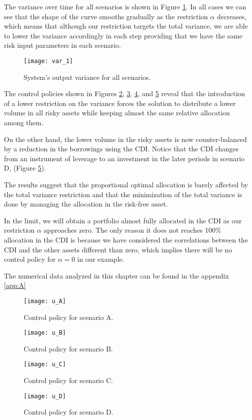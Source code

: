 The variance over time for all scenarios is shown in Figure \ref{fig:var1}. In all cases we can see that the shape of the curve smooths gradually as the restriction $\alpha$ decreases, which means that although our restriction targets the total variance, we are able to lower the variance accordingly in each step providing that we have the same risk input parameters in each scenario.
%
\begin{figure} [h!]
    \caption{System's output variance for all scenarios.}
    \centering
    \texttt{[image: var\_1]}
    \label{fig:var1}
\end{figure}

The control policies shown in Figures \ref{fig:u1}, \ref{fig:u2}, \ref{fig:u3}, and \ref{fig:u4} reveal that the introduction of a lower restriction on the variance forces the solution to distribute a lower volume in all risky assets while keeping almost the same relative allocation among them.

On the other hand, the lower volume in the risky assets is now counter-balanced by a reduction in the borrowings using the CDI. Notice that the CDI changes from an instrument of leverage to an investment in the later periods in scenario D, (Figure \ref{fig:u4}).

The results suggest that the proportional optimal allocation is barely affected by the total variance restriction and that the minimization of the total variance is done by managing the allocation in the risk-free asset.

In the limit, we will obtain a portfolio almost fully allocated in the CDI as our restriction $\alpha$ approaches zero. The only reason it does not reaches 100\% allocation in the CDI is because we have considered the correlations between the CDI and the other assets different than zero, which implies there will be no control policy for $\alpha=0$ in our example.

The numerical data analyzed in this chapter can be found in the appendix \ref{app:A}
%
\begin{figure} [H]
    \caption{Control policy for scenario A.}
    \centering
    \texttt{[image: u\_A]}
    \label{fig:u1}
\end{figure}
%
\begin{figure} [H]
    \caption{Control policy for scenario B.}
    \centering
    \texttt{[image: u\_B]}
    \label{fig:u2}
\end{figure}
%
\begin{figure} [H]
    \caption{Control policy for scenario C.}
    \centering
    \texttt{[image: u\_C]}
    \label{fig:u3}
\end{figure}
%
\begin{figure} [H]
    \caption{Control policy for scenario D.}
    \centering
    \texttt{[image: u\_D]}
    \label{fig:u4}
\end{figure}


